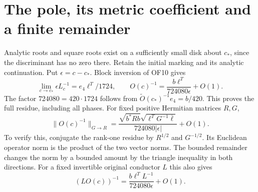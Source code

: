\documentclass[11pt]{article}
\begin{document}
\section{The pole, its metric coefficient and a finite remainder}
Analytic roots and square roots exist on a sufficiently small disk
about $c_*$, since the discriminant has no zero there. Retain the
initial marking and its analytic continuation. Put $\epsilon=c-c_*$.
Block inversion of OF10 gives
\begin{equation}
 \lim_{c\to c_*}\epsilon L_c^{-1}=e_4\ell^T/1724,
 \qquad
 O(c)^{-1}=\frac{b\ell^T}{724080\epsilon}+O(1).
 \tag{OF12}
\end{equation}
The factor $724080=420\cdot1724$ follows from
$\widetilde O(c_*)^{-1}e_4=b/420$. This proves the full residue,
including all phases. For fixed positive Hermitian matrices $R,G$,
\begin{equation}
 \|O(c)^{-1}\|_{G\to R}
 =\frac{\sqrt{b^*Rb}\sqrt{\ell^TG^{-1}\bar\ell}}
 {724080|\epsilon|}+O(1).\tag{OF13}
\end{equation}
To verify this, conjugate the rank-one residue by $R^{1/2}$ and
$G^{-1/2}$. Its Euclidean operator norm is the product of the
two vector norms. The bounded remainder changes the norm by a
bounded amount by the triangle inequality in both directions.
For a fixed invertible original conductor $L$ this also gives
\[
 (LO(c))^{-1}=\frac{b\ell^TL^{-1}}{724080\epsilon}+O(1).
\]
\end{document}
